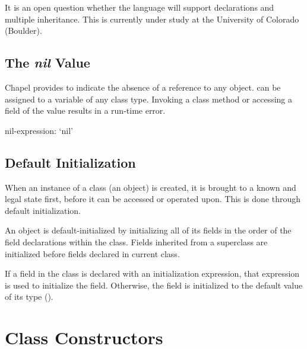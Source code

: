 \begin{openissue}
It is an open question whether the language will support 
declarations and multiple inheritance. This is currently under study
at the University of Colorado (Boulder).
\end{openissue}

\subsection{The {\em nil} Value}
\label{Class_nil_value}

Chapel provides  to indicate the absence of a reference to
any object.   can be assigned to a variable of any class
type.  Invoking a class method or accessing a field of the 
value results in a run-time error.

\begin{syntax}
nil-expression:
  `nil'
\end{syntax}

\subsection{Default Initialization}
\label{Default_Initialization}

When an instance of a class (an object) is created, it is brought to a
known and legal state first, before it can be accessed or operated upon.
This is done through default initialization.

An object is default-initialized by initializing all of its fields in
the order of the field declarations within the class. Fields inherited
from a superclass are initialized before fields declared in current class.

If a field in the class is declared with an initialization expression, that
expression is used to initialize the field.  Otherwise, the field is
initialized to the default value of its type
().

\section{Class Constructors}
\label{Class_Constructors}
\label{Class_New}

